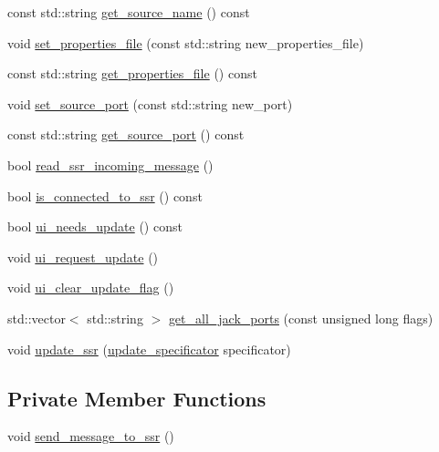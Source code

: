\begin{DoxyCompactItemize}
\item 
const std\-::string \hyperlink{classSsrSceneAutomationAudioProcessor_ade71ef4fe651826fe1de17778f4a6066}{get\-\_\-source\-\_\-name} () const 
\item 
void \hyperlink{classSsrSceneAutomationAudioProcessor_ad62d5f7c45526d350b6f20927fc21511}{set\-\_\-properties\-\_\-file} (const std\-::string new\-\_\-properties\-\_\-file)
\item 
const std\-::string \hyperlink{classSsrSceneAutomationAudioProcessor_a8c831a4c51ba2f963d0997b27f7fa15d}{get\-\_\-properties\-\_\-file} () const 
\item 
void \hyperlink{classSsrSceneAutomationAudioProcessor_a2f7d4376ccee717fa5553eb3bc000fe2}{set\-\_\-source\-\_\-port} (const std\-::string new\-\_\-port)
\item 
const std\-::string \hyperlink{classSsrSceneAutomationAudioProcessor_a9880e8af71ebb7649a0c1b0b82682c78}{get\-\_\-source\-\_\-port} () const 
\item 
bool \hyperlink{classSsrSceneAutomationAudioProcessor_afd82a1fa84469a1ac573c27392cf2f94}{read\-\_\-ssr\-\_\-incoming\-\_\-message} ()
\item 
bool \hyperlink{classSsrSceneAutomationAudioProcessor_a7bb6fce56ec87f75947168a8feba5ea3}{is\-\_\-connected\-\_\-to\-\_\-ssr} () const 
\item 
bool \hyperlink{classSsrSceneAutomationAudioProcessor_a0061dc6f04b69c2a77097ca535c80ad9}{ui\-\_\-needs\-\_\-update} () const 
\item 
void \hyperlink{classSsrSceneAutomationAudioProcessor_a19f85fce91341f901ee7094b326d2d6f}{ui\-\_\-request\-\_\-update} ()
\item 
void \hyperlink{classSsrSceneAutomationAudioProcessor_a6daf4a8c2e26e0912c2d3d218e35bfd9}{ui\-\_\-clear\-\_\-update\-\_\-flag} ()
\item 
std\-::vector$<$ std\-::string $>$ \hyperlink{classSsrSceneAutomationAudioProcessor_af8ebc51eaf16e72a4497f190cd3da3d5}{get\-\_\-all\-\_\-jack\-\_\-ports} (const unsigned long flags)
\item 
void \hyperlink{classSsrSceneAutomationAudioProcessor_a27e503cea52e39e00694f5049a1bfad3}{update\-\_\-ssr} (\hyperlink{classSsrSceneAutomationAudioProcessor_ac035d17c84c4f0155bf36023b3f6cb66}{update\-\_\-specificator} specificator)
\end{DoxyCompactItemize}
\subsection*{Private Member Functions}
\begin{DoxyCompactItemize}
\item 
void \hyperlink{classSsrSceneAutomationAudioProcessor_a2c60db16017bac6a6dd9e7613fba233f}{send\-\_\-message\-\_\-to\-\_\-ssr} ()
\end{DoxyCompactItemize}

